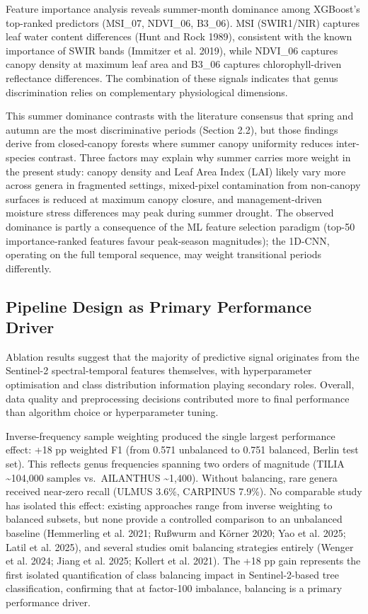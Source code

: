 \documentclass[11pt,a4paper]{scrartcl}
\begin{document}
Feature importance analysis reveals summer-month dominance among
XGBoost's top-ranked predictors (MSI\_07, NDVI\_06, B3\_06). MSI
(SWIR1/NIR) captures leaf water content differences (Hunt and Rock
1989), consistent with the known importance of SWIR bands (Immitzer et
al. 2019), while NDVI\_06 captures canopy density at maximum leaf area
and B3\_06 captures chlorophyll-driven reflectance differences. The
combination of these signals indicates that genus discrimination relies
on complementary physiological dimensions.

This summer dominance contrasts with the literature consensus that
spring and autumn are the most discriminative periods (Section 2.2), but
those findings derive from closed-canopy forests where summer canopy
uniformity reduces inter-species contrast. Three factors may explain why
summer carries more weight in the present study: canopy density and Leaf
Area Index (LAI) likely vary more across genera in fragmented settings,
mixed-pixel contamination from non-canopy surfaces is reduced at maximum
canopy closure, and management-driven moisture stress differences may
peak during summer drought. The observed dominance is partly a
consequence of the ML feature selection paradigm (top-50
importance-ranked features favour peak-season magnitudes); the 1D-CNN,
operating on the full temporal sequence, may weight transitional periods
differently.

\subsection{Pipeline Design as Primary Performance
Driver}\label{pipeline-design-as-primary-performance-driver}

Ablation results suggest that the majority of predictive signal
originates from the Sentinel-2 spectral-temporal features themselves,
with hyperparameter optimisation and class distribution information
playing secondary roles. Overall, data quality and preprocessing
decisions contributed more to final performance than algorithm choice or
hyperparameter tuning.

Inverse-frequency sample weighting produced the single largest
performance effect: +18 pp weighted F1 (from 0.571 unbalanced to 0.751
balanced, Berlin test set). This reflects genus frequencies spanning two
orders of magnitude (TILIA \textasciitilde104,000 samples vs.~AILANTHUS
\textasciitilde1,400). Without balancing, rare genera received near-zero
recall (ULMUS 3.6\%, CARPINUS 7.9\%). No comparable study has isolated
this effect: existing approaches range from inverse weighting to
balanced subsets, but none provide a controlled comparison to an
unbalanced baseline (Hemmerling et al. 2021; Rußwurm and Körner 2020;
Yao et al. 2025; Latil et al. 2025), and several studies omit balancing
strategies entirely (Wenger et al. 2024; Jiang et al. 2025; Kollert et
al. 2021). The +18 pp gain represents the first isolated quantification
of class balancing impact in Sentinel-2-based tree classification,
confirming that at factor-100 imbalance, balancing is a primary
performance driver.
\end{document}
